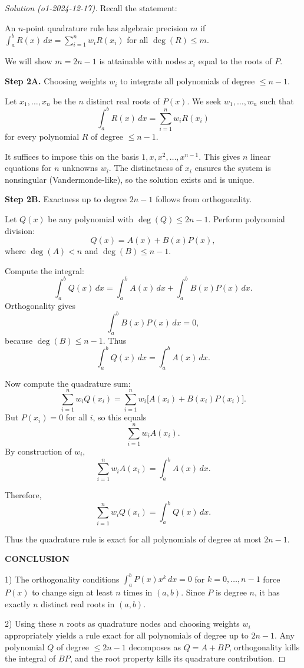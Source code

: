 \documentclass[11pt]{article}
\numberwithin{equation}{section}
\begin{document}
\begin{proof}[Solution (o1-2024-12-17)]
Recall the statement:


An $n$-point quadrature rule has algebraic precision $m$ if 
$\int_a^b R(x)\, dx = \sum_{i=1}^n w_i R(x_i)$
\quad for all $\deg(R)\le m$.


We will show $m=2n-1$ is attainable with nodes $x_i$ equal to the roots of $P$.

\textbf{Step 2A.} Choosing weights $w_i$ to integrate all polynomials of degree $\le n-1$.

Let $x_1,\dots,x_n$ be the $n$ distinct real roots of $P(x)$.  We seek $w_1,\dots,w_n$ such that
\[
\int_a^b R(x)\, dx = \sum_{i=1}^n w_i R(x_i)
\]
for every polynomial $R$ of degree $\le n-1$.

It suffices to impose this on the basis $1,x,x^2,\dots,x^{n-1}$.  This gives $n$ linear equations for $n$ unknowns $w_i$.  The distinctness of $x_i$ ensures the system is nonsingular (Vandermonde-like), so the solution exists and is unique.

\textbf{Step 2B.} Exactness up to degree $2n-1$ follows from orthogonality.

Let $Q(x)$ be any polynomial with $\deg(Q)\le 2n-1$.  Perform polynomial division:
\[
Q(x)=A(x)+B(x)P(x),
\]
where $\deg(A)<n$ and $\deg(B)\le n-1$.

Compute the integral:
\[
\int_a^b Q(x)\, dx = \int_a^b A(x)\, dx + \int_a^b B(x)P(x)\, dx.
\]
Orthogonality gives
\[
\int_a^b B(x)P(x)\, dx = 0,
\]
because $\deg(B)\le n-1$.  Thus
\[
\int_a^b Q(x)\, dx = \int_a^b A(x)\, dx.
\]

Now compute the quadrature sum:
\[
\sum_{i=1}^n w_i Q(x_i)
= \sum_{i=1}^n w_i \bigl[A(x_i)+B(x_i)P(x_i)\bigr].
\]
But $P(x_i)=0$ for all $i$, so this equals
\[
\sum_{i=1}^n w_i A(x_i).
\]
By construction of $w_i$,
\[
\sum_{i=1}^n w_i A(x_i)=\int_a^b A(x)\, dx.
\]

Therefore,
\[
\sum_{i=1}^n w_i Q(x_i)
= \int_a^b Q(x)\, dx.
\]

Thus the quadrature rule is exact for all polynomials of degree at most $2n-1$.


\textbf{CONCLUSION}


1) The orthogonality conditions $\int_a^b P(x)x^k\,dx=0$ for $k=0,\dots,n-1$ force $P(x)$ to change sign at least $n$ times in $(a,b)$.  Since $P$ is degree $n$, it has exactly $n$ distinct real roots in $(a,b)$.

2) Using these $n$ roots as quadrature nodes and choosing weights $w_i$ appropriately yields a rule exact for all polynomials of degree up to $2n-1$.  Any polynomial $Q$ of degree $\le 2n-1$ decomposes as $Q=A+BP$, orthogonality kills the integral of $BP$, and the root property kills its quadrature contribution.


\end{proof}
\end{document}

